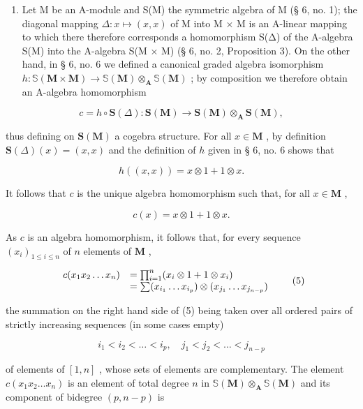 \begin{enumerate}
\def\labelenumi{(\arabic{enumi})}
\setcounter{enumi}{5}
\tightlist
\item
  Let M be an A-module and S(M) the symmetric algebra of M (§ 6, no. 1); the diagonal mapping \(\Delta: x \mapsto (x, x)\) of M into M × M is an A-linear mapping to which there therefore corresponds a homomorphism S(Δ) of the A-algebra S(M) into the A-algebra S(M × M) (§ 6, no. 2, Proposition 3). On the other hand, in § 6, no. 6 we defined a canonical graded algebra isomorphism \(h \colon \mathbb{S}(\mathbf{M} \times \mathbf{M}) \to \mathbb{S}(\mathbf{M}) \otimes_{\mathbf{A}} \mathbb{S}(\mathbf{M})\) ; by composition we therefore obtain an A-algebra homomorphism
\end{enumerate}

\[
c = h \circ \mathbf {S} (\Delta): \mathbf {S} (\mathbf {M}) \rightarrow \mathbf {S} (\mathbf {M}) \otimes_ {\mathbf {A}} \mathbf {S} (\mathbf {M}),
\]

thus defining on \(\mathbf{S}(\mathbf{M})\) a cogebra structure. For all \(x\in \mathbf{M}\) , by definition \(\mathbf{S}(\Delta)(x) = (x,x)\) and the definition of \(h\) given in § 6, no. 6 shows that

\[
h ((x, x)) = x \otimes 1 + 1 \otimes x.
\]

It follows that \(c\) is the unique algebra homomorphism such that, for all \(x \in \mathbf{M}\) ,

\[
c (x) = x \otimes 1 + 1 \otimes x.\tag{4}
\]

As \(c\) is an algebra homomorphism, it follows that, for every sequence \((x_{i})_{1\leqslant i\leqslant n}\) of \(n\) elements of \(\mathbf{M}\) ,

\[
\begin{array}{r l} c (x _ {1} x _ {2} \dots x _ {n}) & = \prod_ {i = 1} ^ {n} (x _ {i} \otimes 1 + 1 \otimes x _ {i}) \\ & = \sum (x _ {i _ {1}} \dots x _ {i _ {p}}) \otimes (x _ {j _ {1}} \dots x _ {j _ {n - p}}) \end{array}\tag{5}
\]

the summation on the right hand side of (5) being taken over all ordered pairs of strictly increasing sequences (in some cases empty)

\[
i _ {1} <   i _ {2} <   \dots <   i _ {p}, \quad j _ {1} <   j _ {2} <   \dots <   j _ {n - p}
\]

of elements of \([1, n]\) , whose sets of elements are complementary. The element \(c(x_1 x_2 \ldots x_n)\) is an element of total degree \(n\) in \(\mathbb{S}(\mathbf{M}) \otimes_{\mathbf{A}} \mathbb{S}(\mathbf{M})\) and its component of bidegree \((p, n - p)\) is

